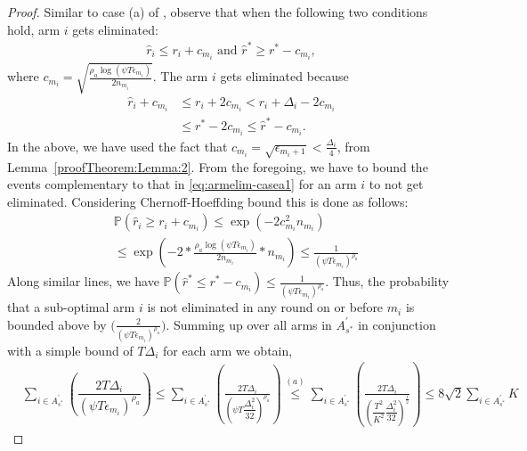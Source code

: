 \begin{proof}
Similar to case (a) of \cite{auer2010ucb}, observe that when the following two conditions hold, arm $i$ gets eliminated:
\begin{align}
\hat{r}_{i}  \le r_{i} + c_{m_i} \text{ and } 
 \hat{r}^{*}\geq  r^{*} - c_{m_i}, \label{eq:armelim-casea1}
\end{align}
where  $c_{m_i} = \sqrt{\frac{\rho_{a}\log (\psi T\epsilon_{m_{i}})}{2 n_{m_i}}}$. The arm $i$ gets eliminated because 
  \begin{align*}
\hat{r}_{i} +c_{m_i} & \leq r_{i} + 2c_{m_i} < r_{i} + \Delta_{i} - 2c_{m_i}\\
 &\leq r^{*} -2c_{m_i} \leq \hat{r}^{*} - c_{m_i}  .
  \end{align*}
In the above, we have used the fact that $ c_{m_i} = \sqrt{\epsilon_{m_{i}+1}} < \frac{\Delta_{i}}{4}$,  from Lemma~\ref{proofTheorem:Lemma:2}. From the foregoing, we have to bound the events complementary to that in \eqref{eq:armelim-casea1} for an arm $i$ to not get eliminated. Considering Chernoff-Hoeffding bound this is done as follows:
  \begin{align*}
&\mathbb{P}\left(\hat{r}_{i}\geq r_{i} + c_{m_i}\right)\leq \exp(-2c_{m_i}^{2}n_{m_i})\\
&\leq \exp(-2 * \frac{\rho_{a}\log (\psi T\epsilon_{m_{i}})}{2 n_{m_i}} *n_{m_i})
\leq \frac{1}{(\psi T\epsilon_{m_{i}})^{\rho_{a}}}   
  \end{align*}
Along similar lines, we have $\mathbb{P}\left(\hat{r}^{*}\leq r^{*} - c_{m_i}\right)\leq \frac{1}{(\psi  T\epsilon_{m_{i}})^{\rho_{a}}}.$ Thus, the probability that a sub-optimal arm ${i}$ is not eliminated in any round on or before $m_{i}$ is bounded above by $\bigg(\frac{2}{(\psi T\epsilon_{m_{i}})^{\rho_{a}}}\bigg)$. 
 Summing up over all arms in $A_{s^{*}}^{'}$ in conjunction with a simple bound of $T\Delta_{i}$ for each arm we obtain,
   \begin{align*}
&\sum_{i\in A_{s^{*}}^{'}}\left(\dfrac{2T\Delta_{i}}{(\psi T\epsilon_{m_{i}})^{\rho_{a}}}\right)
\leq\sum_{i\in A_{s^{*}}^{'}}\left(\frac{2T\Delta_{i}}{(\psi T\dfrac{\Delta_{i}^{2}}{32})^{\rho_{a}}}\right)
\overset{(a)}{\leq} \sum_{i\in A_{s^{*}}^{'}}\left(\frac{2T\Delta_{i}}{(\dfrac{T^2}{K^2}\dfrac{\Delta_{i}^{2}}{32})^{\frac{1}{2}}}\right)\leq 8\sqrt{2} \sum_{i\in A_{s^{*}}^{'}}K
   \end{align*}
   

\end{proof}
